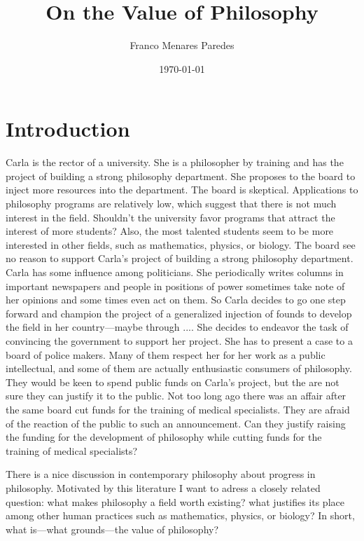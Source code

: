 \documentclass[12pt]{article}
\title{On the Value of Philosophy}
\author{Franco Menares Paredes}
\date{\today}
\begin{document}
\maketitle

\section{Introduction}

Carla is the rector of a university. She is a philosopher by training and has the project of building a strong philosophy department. She proposes to the board to inject more resources into the department. The board is skeptical. Applications to philosophy programs are relatively low, which suggest that there is not much interest in the field. Shouldn't the university favor programs that attract the interest of more students? Also, the most talented students seem to be more interested in other fields, such as mathematics, physics, or biology. The board see no reason to support Carla's project of building a strong philosophy department. Carla has some influence among politicians. She periodically writes columns in important newspapers and people in positions of power sometimes take note of her opinions and some times even act on them. So Carla decides to go one step forward and champion the project of a generalized injection of founds to develop the field in her country—maybe through .... She decides to endeavor the task of convincing the government to support her project. She has to present a case to a board of police makers. Many of them respect her for her work as a public intellectual, and some of them are actually enthusiastic consumers of philosophy. They would be keen to spend public funds on Carla's project, but the are not sure they can justify it to the public. Not too long ago there was an affair after the same board cut funds for the training of medical specialists. They are afraid of the reaction of the public to such an announcement. Can they justify raising the funding for the development of philosophy while cutting funds for the training of medical specialists? 

There is a nice discussion in contemporary philosophy about progress in philosophy. Motivated by this literature I want to adress a closely related question: what makes philosophy a field worth existing? what justifies its place among other human practices such as mathematics, physics, or biology? In short, what is—what grounds—the value of philosophy?



\newpage


\end{document}
